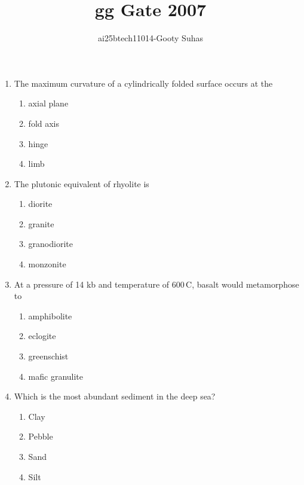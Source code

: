 \documentclass[journal,12pt,onecolumn]{IEEEtran}
\theoremstyle{remark}
\begin{document}
\title{gg Gate 2007}
\author{ai25btech11014-Gooty Suhas}
\maketitle
\begin{enumerate}

\item The maximum curvature of a cylindrically folded surface occurs at the
\begin{multicols}{4}
\begin{enumerate}
\item axial plane
\item fold axis
\item hinge
\item limb
\end{enumerate}
\end{multicols}
\vspace{0.5cm}

\item The plutonic equivalent of rhyolite is
\begin{multicols}{4}
\begin{enumerate}
\item diorite
\item granite
\item granodiorite
\item monzonite
\end{enumerate}
\end{multicols}
\vspace{0.5cm}

\item At a pressure of 14 kb and temperature of 600\,\textdegree C, basalt would metamorphose to
\begin{multicols}{4}
\begin{enumerate}
\item amphibolite
\item eclogite
\item greenschist
\item mafic granulite
\end{enumerate}
\end{multicols}
\vspace{0.5cm}

\item Which is the most abundant sediment in the deep sea?
\begin{multicols}{4}
\begin{enumerate}
\item Clay
\item Pebble
\item Sand
\item Silt
\end{enumerate}
\end{multicols}
\vspace{0.5cm}


\end{enumerate}
\end{document}
